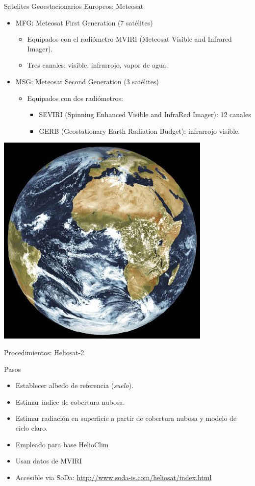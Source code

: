 \documentclass[xcolor={usenames,svgnames,dvipsnames}]{beamer}
\begin{document}
\begin{frame}[label=sec-6-4-2]{Satelites Geoestacionarios Europeos: Meteosat}
\begin{itemize}
\item \alert{MFG}: Meteosat First Generation (7 satélites)
\begin{itemize}
\item Equipados con el radiómetro MVIRI (Meteosat Visible and Infrared Imager).
\item Tres canales: visible, infrarrojo, vapor de agua.
\end{itemize}
\item \alert{MSG}: Meteosat Second Generation (3 satélites)
\begin{itemize}
\item Equipados con dos radiómetros:
\begin{itemize}
\item \alert{SEVIRI} (Spinning Enhanced Visible and InfraRed Imager): 12 canales
\item GERB (Geostationary Earth Radiation Budget): infrarrojo visible.
\end{itemize}
\end{itemize}
\end{itemize}

\begin{center}
\includegraphics[height=0.3\textwidth]{../figs/Tierra_MSG.jpg}
\end{center}
\end{frame}


\begin{frame}[label=sec-6-4-3]{Procedimientos: Heliosat-2}
\begin{block}{Pasos}
\begin{itemize}
\item Establecer \alert{albedo de referencia} (\emph{suelo}).
\item Estimar \alert{índice de cobertura nubosa}.
\item Estimar radiación en superficie a partir de cobertura nubosa y \alert{modelo de cielo claro}.
\end{itemize}
\end{block}

\begin{block}{}
\begin{itemize}
\item Empleado para base HelioClim
\item Usan datos de MVIRI
\item Accesible via SoDa: \url{http://www.soda-is.com/heliosat/index.html}
\end{itemize}

\nocite{Rigollier.Lefevre.ea2004}
\end{block}
\end{frame}
\end{document}
